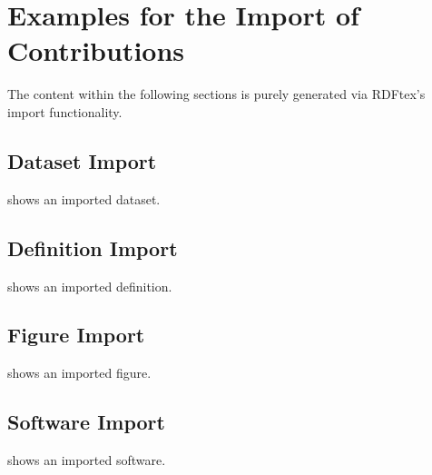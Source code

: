 
\section{Examples for the Import of Contributions}

The content within the following sections is purely generated via RDFtex's import functionality.

\subsection{Dataset Import}


 shows an imported dataset.

\subsection{Definition Import}


 shows an imported definition.

\subsection{Figure Import}


 shows an imported figure.

\subsection{Software Import}


 shows an imported software.


